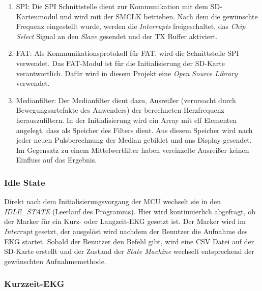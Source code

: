\begin{enumerate}
    \item SPI: Die SPI Schnittstelle dient zur Kommunikation mit dem SD-Kartenmodul und wird mit der SMCLK betrieben. Nach dem die gewünschte Frequenz eingestellt wurde, werden die \textit{Interrupts} freigeschaltet, das \textit{Chip Select} Signal an den \textit{Slave} gesendet und der TX Buffer aktiviert.
    \item FAT: Als Kommunikationsprotokoll für FAT, wird die Schnittstelle SPI verwendet. Das FAT-Modul ist für die Initialisierung der SD-Karte verantwortlich. Dafür wird in diesem Projekt eine \textit{Open Source Library} verwendet. \cite{FatFs_Lib} \cite{FatFs_Entwickler} 
    \item Medianfilter: Der Medianfilter dient dazu, Ausreißer (verursacht durch Bewegungsartefakte des Anwenders) der berechneten Herzfrequenz herauszufiltern. In der Initialisierung wird ein Array mit elf Elementen angelegt, dass als Speicher des Filters dient. Aus diesem Speicher wird nach jeder neuen Pulsberechnung der Median gebildet und ans Display gesendet. Im Gegensatz zu einem Mittelwertfilter haben vereinzelte Ausreißer keinen Einfluss auf das Ergebnis.
\end{enumerate}

\subsubsection{Idle State}

Direkt nach dem Initialisierungsvorgang der MCU wechselt sie in den \textit{IDLE\_STATE} (Leerlauf des Programms). 
Hier wird kontinuierlich abgefragt, ob der Marker für ein Kurz- oder Langzeit-EKG gesetzt ist. Der Marker wird im \textit{Interrupt} gesetzt, der ausgelöst wird nachdem der Benutzer die Aufnahme des EKG startet.
Sobald der Benutzer den Befehl gibt, wird eine CSV Datei auf der SD-Karte erstellt und der Zustand der \textit{State Machine} wechselt entsprechend der gewünschten Aufnahmemethode.

\subsubsection{Kurzzeit-EKG}

